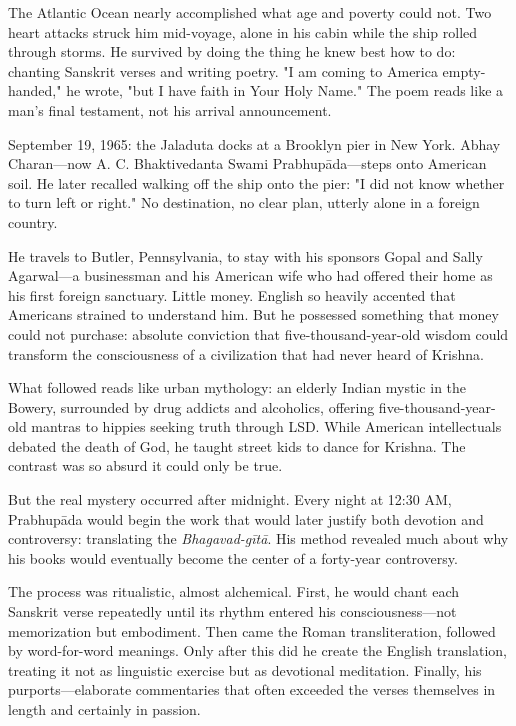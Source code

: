 \documentclass[12pt,twoside]{book}
\begin{document}
The Atlantic Ocean nearly accomplished what age and poverty could not. Two heart attacks struck him mid-voyage, alone in his cabin while the ship rolled through storms. He survived by doing the thing he knew best how to do: chanting Sanskrit verses and writing poetry. "I am coming to America empty-handed," he wrote, "but I have faith in Your Holy Name." The poem reads like a man's final testament, not his arrival announcement.

September 19, 1965: the Jaladuta docks at a Brooklyn pier in New York. Abhay Charan—now A. C. Bhaktivedanta Swami Prabhupāda—steps onto American soil. He later recalled walking off the ship onto the pier: "I did not know whether to turn left or right." No destination, no clear plan, utterly alone in a foreign country.

He travels to Butler, Pennsylvania, to stay with his sponsors Gopal and Sally Agarwal—a businessman and his American wife who had offered their home as his first foreign sanctuary. Little money. English so heavily accented that Americans strained to understand him. But he possessed something that money could not purchase: absolute conviction that five-thousand-year-old wisdom could transform the consciousness of a civilization that had never heard of Krishna.

What followed reads like urban mythology: an elderly Indian mystic in the Bowery, surrounded by drug addicts and alcoholics, offering five-thousand-year-old mantras to hippies seeking truth through LSD. While American intellectuals debated the death of God, he taught street kids to dance for Krishna. The contrast was so absurd it could only be true.

But the real mystery occurred after midnight. Every night at 12:30 AM, Prabhupāda would begin the work that would later justify both devotion and controversy: translating the \emph{Bhagavad-gītā}. His method revealed much about why his books would eventually become the center of a forty-year controversy.

The process was ritualistic, almost alchemical. First, he would chant each Sanskrit verse repeatedly until its rhythm entered his consciousness—not memorization but embodiment. Then came the Roman transliteration, followed by word-for-word meanings. Only after this did he create the English translation, treating it not as linguistic exercise but as devotional meditation. Finally, his purports—elaborate commentaries that often exceeded the verses themselves in length and certainly in passion.
\end{document}
